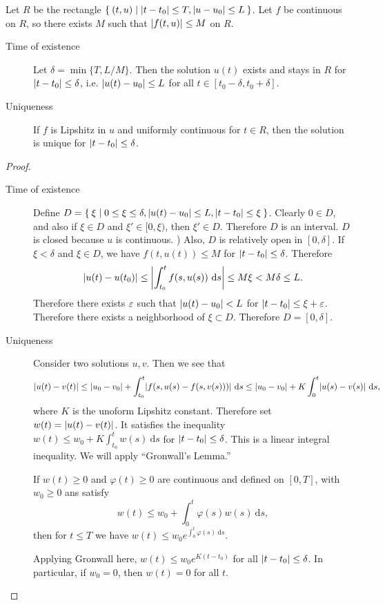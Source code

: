 \documentclass[10pt, twoside]{article}
\renewcommand{\d}{\ \mathrm{d}}
\begin{document}
    \begin{thm} Let $R$ be the rectangle $\Set{(t,u) | \lvert t-t_0\rvert \leq T,
        \lvert u-u_0\rvert \leq L}$. Let $f$ be continuous on $R$, so there exists $M$
        such that $\lvert f(t,u)\rvert \leq M$ on $R$.  \begin{description} \item[Time
            of existence] Let $\delta = \min \{T,L/M\}$. Then the solution
            $u(t)$ exists and stays in $R$ for $\lvert t-t_0\rvert \leq \delta$, i.e.
            $\lvert u(t) - u_0\rvert \leq L$ for all $t \in [t_0-\delta, t_0+\delta]$.
\item[Uniqueness] If $f$ is Lipshitz in $u$ and uniformly continuous for $t \in
R$, then the solution is unique for $\lvert t-t_0\rvert \leq \delta$.
\end{description} \begin{proof} \begin{description} \item[Time of existence]
Define $D = \Set{\xi | 0 \leq \xi \leq \delta, \lvert u(t)-u_0\rvert \leq L,
\lvert t-t_0\rvert \leq \xi}$. Clearly $0 \in D$, and also if $\xi \in D$ and $\xi'
\in [0,\xi)$, then $\xi' \in D$. Therefore $D$ is an interval. $D$ is closed
because $u$ is continuous. ) Also, $D$ is relatively open in $[0,\delta]$. If
$\xi < \delta$ and $\xi \in D$, we have $f(t,u(t)) \leq M$ for $\lvert t-t_0\rvert
\leq \delta$. Therefore \[ \abs{u(t) - u(t_0)} \leq \abs*{\int_{t_0}^t
f(s,u(s)) \d s } \leq M \xi < M \delta \leq L. \] Therefore there exists $\varepsilon$
such that $\lvert u(t) - u_0\rvert < L$ for $\lvert t-t_0\rvert \leq \xi + \varepsilon$. Therefore
there exists a neighborhood of $\xi \subset D$. Therefore $D = [0,\delta]$.
\item[Uniqueness] Consider two solutions $u,v$. Then we see that \[\abs{u(t) -
    v(t)} \leq \abs{u_0-v_0} + \int_{t_0}^t \abs{f(s,u(s) - f(s,v(s)))} \d s
\leq \abs{u_0-v_0} + K \int_0^t \abs{u(s) - v(s)} \d s, \] where $K$ is the
unoform Lipshitz constant. Therefore set $w(t) = \lvert u(t) - v(t)\rvert$. It
satisfies the inequality $w(t) \leq w_0 + K \int_{t_0}^t w(s) \d s$ for
$\lvert t-t_0\rvert \leq \delta$. This is a linear integral inequality. We will apply
``Gronwall's Lemma.''

                 \begin{lem}[Gronwall] If $w(t) \geq 0$ and $\varphi(t) \geq 0$
                     are continuous and defined on $[0,T]$, with $w_0 \geq 0$
                     ans satisfy \[ w(t) \leq w_0 + \int_0^t \varphi(s)w(s) \d
                     s, \] then for $t \leq T$ we have $w(t) \leq w_0
                     e^{\int_0^t \varphi(s)\d s}$.  \end{lem}

                 Applying Gronwall here, $w(t) \leq w_0e^{K(t-t_0)}$ for all
         $\lvert t-t_0\rvert \leq \delta$. In particular, if $w_0 = 0$, then $w(t) =
 0$ for all $t$. \qedhere \end{description}           \end{proof} \end{thm}
\end{document}
